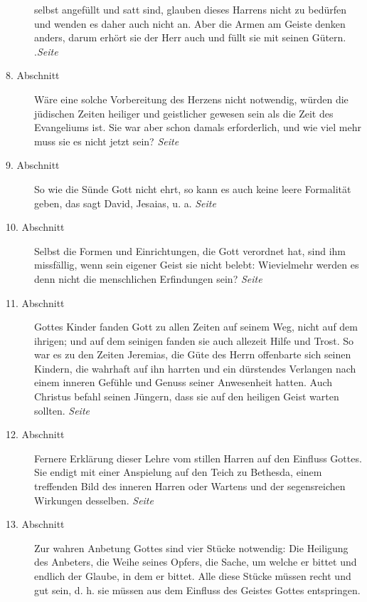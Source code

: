 \begin{description}
selbst angefüllt und satt sind, glauben dieses Harrens nicht zu bedürfen und
wenden es daher auch nicht an. Aber die Armen am Geiste denken anders, darum
erhört sie der Herr auch und füllt sie mit seinen Gütern.\\
.\dotfill \textit{Seite~\pageref{kap6_ab7}}\\
\item[8. Abschnitt] Wäre eine solche
Vorbereitung des Herzens nicht notwendig, würden die jüdischen Zeiten heiliger
und geistlicher gewesen sein als die Zeit des Evangeliums ist. Sie war aber
schon damals erforderlich, und wie viel mehr muss sie es nicht jetzt sein?
\dotfill \textit{Seite~\pageref{kap6_ab8}}\\
\item[9. Abschnitt] So wie die Sünde Gott nicht ehrt, so kann es auch keine
leere Formalität geben, das sagt David, Jesaias, u. a.
\dotfill \textit{Seite~\pageref{kap6_ab9}}\\
\item[10. Abschnitt] Selbst die Formen und Einrichtungen, die Gott verordnet
hat, sind ihm missfällig, wenn sein eigener Geist sie nicht belebt: Wievielmehr
werden es denn nicht die menschlichen Erfindungen sein?
\dotfill \textit{Seite~\pageref{kap6_ab10}}\\
\item[11. Abschnitt] Gottes Kinder fanden Gott zu allen Zeiten auf seinem Weg,
nicht auf dem ihrigen; und auf dem seinigen fanden sie auch allezeit Hilfe und
Trost. So war es zu den Zeiten Jeremias, die Güte des Herrn offenbarte sich
seinen Kindern, die wahrhaft auf ihn harrten und ein dürstendes Verlangen nach
einem inneren Gefühle und Genuss seiner Anwesenheit hatten. Auch Christus befahl
seinen Jüngern, dass sie auf den heiligen Geist warten sollten.
\dotfill \textit{Seite~\pageref{kap6_ab11}}\\
\item[12. Abschnitt] Fernere Erklärung dieser Lehre vom stillen Harren auf den
Einfluss Gottes. Sie endigt mit einer Anspielung auf den Teich zu Bethesda,
einem treffenden Bild des inneren Harren oder Wartens und der segensreichen
Wirkungen desselben.
\dotfill \textit{Seite~\pageref{kap6_ab12}}\\
\item[13. Abschnitt] Zur wahren Anbetung Gottes sind vier Stücke notwendig: Die
Heiligung des Anbeters, die Weihe seines Opfers, die Sache, um welche er bittet
und endlich der Glaube, in dem er bittet. Alle diese Stücke müssen recht und gut
sein, d. h. sie müssen aus dem Einfluss des Geistes Gottes entspringen.

\end{description}
